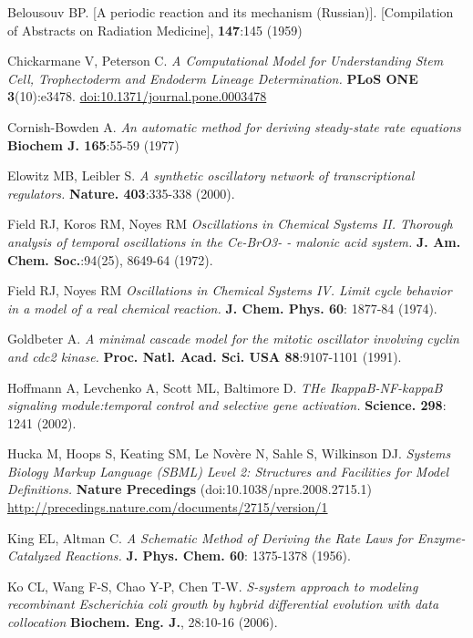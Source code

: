 \begin{thebibliography}{99}

Belousouv BP.
[A periodic reaction and its mechanism (Russian)].
[Compilation of Abstracts on Radiation Medicine], \textbf{147}:145 (1959)

Chickarmane V, Peterson C.
\textit{A Computational Model for Understanding Stem Cell, Trophectoderm and Endoderm Lineage Determination.}
\textbf{PLoS ONE 3}(10):e3478. \url{doi:10.1371/journal.pone.0003478}

Cornish-Bowden A.
\textit{An automatic method for deriving steady-state rate equations}
\textbf{Biochem J. 165}:55-59 (1977)

Elowitz MB, Leibler S.
\textit{A synthetic oscillatory network of transcriptional regulators.}
\textbf{Nature. 403}:335-338 (2000).

Field RJ, Koros RM, Noyes RM 
\textit{Oscillations in Chemical Systems II. Thorough analysis of temporal oscillations in the Ce-BrO3- - malonic acid system.}
\textbf{J. Am. Chem. Soc.}:94(25), 8649-64 (1972).

Field RJ, Noyes RM
\textit{Oscillations in Chemical Systems IV. Limit cycle behavior in a model of a real chemical reaction.}
\textbf{J. Chem. Phys. 60}: 1877-84 (1974).

Goldbeter A.
\textit{A minimal cascade model for the mitotic oscillator involving cyclin and cdc2 kinase.}
\textbf{Proc. Natl. Acad. Sci. USA 88}:9107-1101 (1991).

Hoffmann A, Levchenko A, Scott ML, Baltimore D. 
\textit{THe IkappaB-NF-kappaB signaling module:temporal control and selective gene activation.}
\textbf{Science. 298}: 1241 (2002).

Hucka M, Hoops S, Keating SM, Le Nov\`ere N, Sahle S, Wilkinson DJ.
\textit{Systems Biology Markup Language (SBML) Level 2: Structures and Facilities for Model Definitions. }
\textbf{Nature Precedings} (doi:10.1038/npre.2008.2715.1) \url{http://precedings.nature.com/documents/2715/version/1}

King EL, Altman C.
\textit{A Schematic Method of Deriving the Rate Laws for Enzyme-Catalyzed Reactions.}
\textbf{J. Phys. Chem. 60}: 1375-1378 (1956).

Ko CL, Wang F-S, Chao Y-P, Chen T-W.
\textit{S-system approach to modeling recombinant Escherichia coli growth by
hybrid differential evolution with data collocation}
\textbf{Biochem. Eng. J.}, 28:10-16 (2006).



\end{thebibliography}
